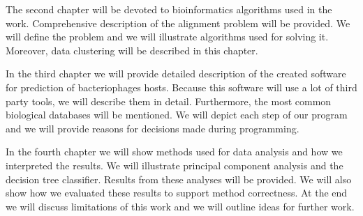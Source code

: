 The second chapter will be devoted to bioinformatics algorithms used in the work.
Comprehensive description of the alignment problem will be provided.
We will define the problem and we will illustrate algorithms used for solving it.
Moreover, data clustering will be described in this chapter.

In the third chapter we will provide detailed description of the created software for prediction of bacteriophages hosts.
Because this software will use a lot of third party tools, we will describe them in detail.
Furthermore, the most common biological databases will be mentioned.
We will depict each step of our program and we will provide reasons for decisions made during programming.

In the fourth chapter we will show methods used for data analysis and how we interpreted the results.
We will illustrate principal component analysis and the decision tree classifier.
Results from these analyses will be provided.
We will also show how we evaluated these results to support method correctness.
At the end we will discuss limitations of this work and we will outline ideas for further work.
